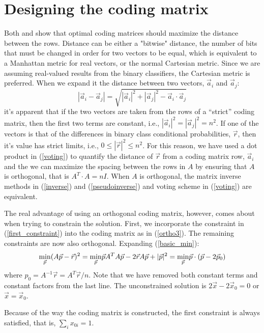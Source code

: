 \documentclass{article}
\begin{document}
\section{Designing the coding matrix}

Both \citet{Dietterich_Bakiri1995} and \citet{Allwein_etal2000} show that 
optimal coding matrices should maximize the distance between the rows.
Distance can be either a "bitwise" distance, the number of bits that must
be changed in order for two vectors to be equal, which is equivalent to a
Manhattan metric for real vectors, or the normal Cartesian metric.
Since we are assuming real-valued results from the binary classifiers, the
Cartesian metric is preferred. When we expand it the distance between
two vectors, $\vec a_i$ and $\vec a_j$:
\begin{equation}
	|\vec a_i - \vec a_j| = \sqrt{|\vec a_i|^2 + |\vec a_j|^2 - \vec a_i \cdot \vec a_j}
\end{equation}
it's apparent that if the two vectors are taken from the rows of a
``strict'' coding matrix,
then the first two terms are constant, i.e., $|\vec a_i|^2 = |\vec a_j|^2 = n^2$. If one of the vectors is that of the differences in binary class conditional
probabilities, $\vec r$, then it's value has strict limits, i.e.,
$0 \le |\vec r|^2 \le n^2$. For this reason, we have used a dot product 
in (\ref{voting}) to
quantify the distance of $\vec r$ from a coding matrix row, $\vec a_i$ and
the we can maximize the spacing between the rows in $A$ by ensuring that
$A$ is orthogonal, that is $A^T \cdot A = n I$. When $A$ is orthogonal,
the matrix inverse methods in (\ref{inverse}) and (\ref{pseudoinverse}) and voting scheme in (\ref{voting}) are equivalent.

The real advantage of using an orthogonal coding matrix, however, comes about
when trying to constrain the solution. First, we incorporate the constraint
in (\ref{first_constraint}) into the coding matrix as in (\ref{ortho3}).
The remaining constraints are now also orthogonal. Expanding (\ref{basic_min}):
\begin{equation}
\underset{\vec p}{\min} (A \vec p - \vec r)^2 \newline
= \underset{\vec p}{\min} \vec p A^T A \vec p - 2 \vec r A \vec p + |\vec p|^2 \newline
= \underset{\vec p}{\min} \vec p \cdot (\vec p - 2 \vec p_0) \newline
\end{equation}
where $p_0 = A^{-1} \vec r = A^T \vec r/n$. Note that we have removed both
constant terms and constant factors from the last line. The unconstrained
solution is $2 \vec x - 2 \vec x_0=0$ or $\vec x = \vec x_0$.

Because of the way the coding matrix is constructed, the first constraint is
always satisfied, that is, $\sum_i x_{0i}=1$. 

 
\end{document}
